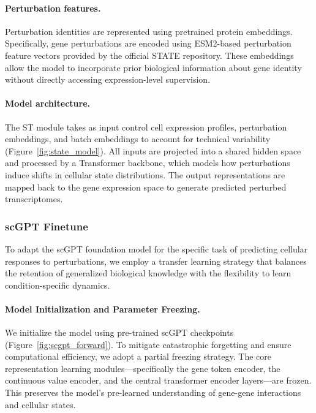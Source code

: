 \documentclass[conference]{IEEEtran}
\begin{document}
\paragraph{Perturbation features.}
Perturbation identities are represented using pretrained protein embeddings.
Specifically, gene perturbations are encoded using ESM2-based perturbation feature vectors provided
by the official STATE repository.
These embeddings allow the model to incorporate prior biological information about gene identity
without directly accessing expression-level supervision.

\paragraph{Model architecture.}
The ST module takes as input control cell expression profiles, perturbation embeddings, and batch embeddings
to account for technical variability (Figure~\ref{fig:state_model}).
All inputs are projected into a shared hidden space and processed by a Transformer backbone,
which models how perturbations induce shifts in cellular state distributions.
The output representations are mapped back to the gene expression space to generate predicted
perturbed transcriptomes.



\subsubsection{scGPT Finetune}

To adapt the scGPT foundation model for the specific task of predicting cellular responses to perturbations, we employ a transfer learning strategy that balances the retention of generalized biological knowledge with the flexibility to learn condition-specific dynamics.

\paragraph{Model Initialization and Parameter Freezing.}
We initialize the model using pre-trained scGPT checkpoints (Figure~\ref{fig:scgpt_forward}). To mitigate catastrophic forgetting and ensure computational efficiency, we adopt a partial freezing strategy. The core representation learning modules---specifically the gene token encoder, the continuous value encoder, and the central transformer encoder layers---are frozen. This preserves the model's pre-learned understanding of gene-gene interactions and cellular states.
\end{document}
